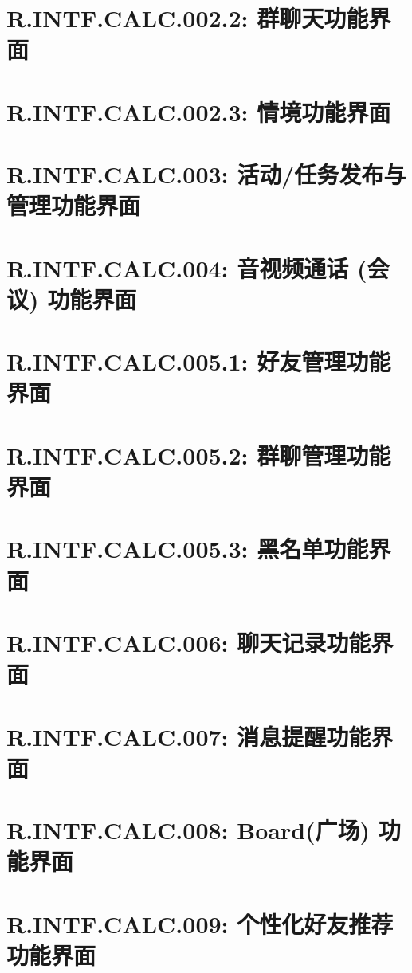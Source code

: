     \section{R.INTF.CALC.002.2: 群聊天功能界面}
    
    \section{R.INTF.CALC.002.3: 情境功能界面}
    
    \section{R.INTF.CALC.003: 活动/任务发布与管理功能界面}
    
    \section{R.INTF.CALC.004: 音视频通话 (会议) 功能界面}
    
    \section{R.INTF.CALC.005.1: 好友管理功能界面}
    
    \section{R.INTF.CALC.005.2: 群聊管理功能界面}
    
    \section{R.INTF.CALC.005.3: 黑名单功能界面}
    
    \section{R.INTF.CALC.006: 聊天记录功能界面}
    
    \section{R.INTF.CALC.007: 消息提醒功能界面}
    
    \section{R.INTF.CALC.008: Board(广场) 功能界面}
    
    \section{R.INTF.CALC.009: 个性化好友推荐功能界面}
    
